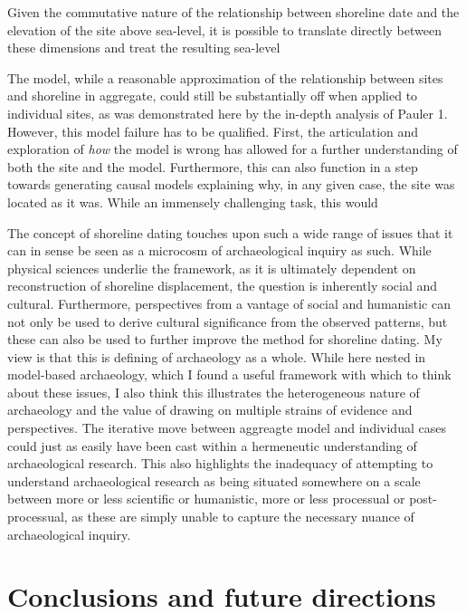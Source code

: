 \documentclass[
  a4paper,
  oneside]{uiophdthesis}
\begin{document}
Given the commutative nature of the relationship between shoreline date and the elevation of the site above sea-level, it is possible to translate directly between these dimensions and treat the resulting sea-level

The model, while a reasonable approximation of the relationship between sites and shoreline in aggregate, could still be substantially off when applied to individual sites, as was demonstrated here by the in-depth analysis of Pauler 1. However, this model failure has to be qualified. First, the articulation and exploration of \emph{how} the model is wrong has allowed for a further understanding of both the site and the model. Furthermore, this can also function in a step towards generating causal models explaining why, in any given case, the site was located as it was. While an immensely challenging task, this would

The concept of shoreline dating touches upon such a wide range of issues that it can in sense be seen as a microcosm of archaeological inquiry as such. While physical sciences underlie the framework, as it is ultimately dependent on reconstruction of shoreline displacement, the question is inherently social and cultural. Furthermore, perspectives from a vantage of social and humanistic can not only be used to derive cultural significance from the observed patterns, but these can also be used to further improve the method for shoreline dating. My view is that this is defining of archaeology as a whole. While here nested in model-based archaeology, which I found a useful framework with which to think about these issues, I also think this illustrates the heterogeneous nature of archaeology and the value of drawing on multiple strains of evidence and perspectives. The iterative move between aggreagte model and individual cases could just as easily have been cast within a hermeneutic understanding of archaeological research. This also highlights the inadequacy of attempting to understand archaeological research as being situated somewhere on a scale between more or less scientific or humanistic, more or less processual or post-processual, as these are simply unable to capture the necessary nuance of archaeological inquiry.

\hypertarget{conclusions-and-future-directions}{%
\section{Conclusions and future directions}\label{conclusions-and-future-directions}}
\end{document}
